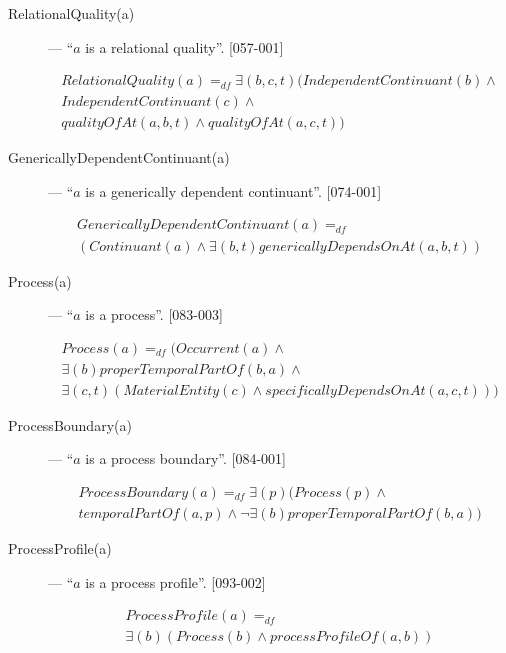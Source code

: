 \documentclass{article}
\newcommand{\DF}{\ensuremath{=_{df}}}
\begin{document}
\begin{description}
\item[RelationalQuality(a)] --- ``$a$ is a relational quality''. [057-001]

\begin{equation}
\begin{split}
RelationalQuality(a) \DF {\exists}(b, c, t)(IndependentContinuant(b) \wedge \\
IndependentContinuant(c) \wedge \\
qualityOfAt(a, b, t) \wedge qualityOfAt(a, c, t))
\end{split}
\end{equation}

\item[GenericallyDependentContinuant(a)] --- ``$a$ is a generically dependent continuant''. [074-001]

\begin{equation}
\begin{split}
GenericallyDependentContinuant(a) \DF \\
(Continuant(a) \wedge {\exists}(b, t)genericallyDependsOnAt(a, b, t))
\end{split}
\end{equation}

\item[Process(a)] --- ``$a$ is a process''. [083-003]

\begin{equation}
\begin{split}
Process(a) \DF (Occurrent(a) \wedge \\
{\exists}(b)properTemporalPartOf(b, a) \wedge \\
{\exists}(c, t)(MaterialEntity(c) \wedge specificallyDependsOnAt(a, c, t)))
\end{split}
\end{equation}

\item[ProcessBoundary(a)] --- ``$a$ is a process boundary''. [084-001]

\begin{equation}
\begin{split}
ProcessBoundary(a) \DF {\exists}(p)(Process(p) \wedge \\
temporalPartOf(a, p) \wedge {\neg}{\exists}(b)properTemporalPartOf(b, a))
\end{split}
\end{equation}

\item[ProcessProfile(a)] --- ``$a$ is a process profile''. [093-002]

\begin{equation}
\begin{split}
ProcessProfile(a) \DF \\
{\exists}(b)(Process(b) \wedge processProfileOf(a, b))
\end{split}
\end{equation}

\end{description}
\end{document}
